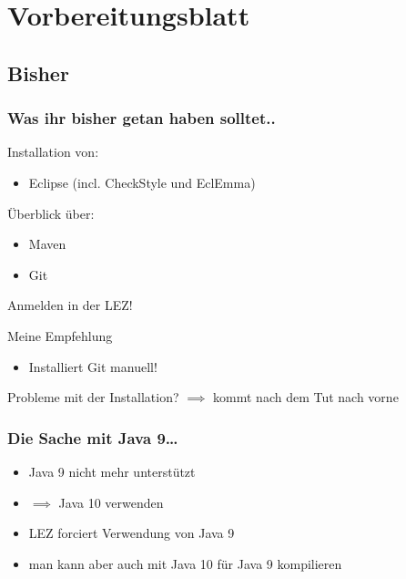 \documentclass[18pt]{beamer}
\begin{document}
\section{Vorbereitungsblatt}
	\subsection{Bisher}
	\begin{frame}
		\frametitle{Was ihr bisher getan haben solltet..}
		Installation von:
		\begin{itemize}
			\item Eclipse (incl. CheckStyle und EclEmma)
		\end{itemize}
		\pause
		Überblick über:
		\begin{itemize}
			\item Maven
			\item Git
		\end{itemize}
	\pause
		Anmelden in der LEZ!
		\pause
		\begin{exampleblock}{Meine Empfehlung}
			\begin{itemize}
				\item Installiert Git manuell!
			\end{itemize}
		\end{exampleblock} \pause
		Probleme mit der Installation? $\implies$ kommt nach dem Tut nach vorne
	\end{frame}

	\begin{frame}
		\frametitle{Die Sache mit Java 9\dots}
		\begin{itemize}
			\item Java 9 nicht mehr unterstützt
			\item $\implies$ Java 10 verwenden \pause
			\item LEZ forciert Verwendung von Java 9
			\item man kann aber auch mit Java 10 für Java 9 kompilieren
		\end{itemize}
\end{frame}
		
\end{document}
